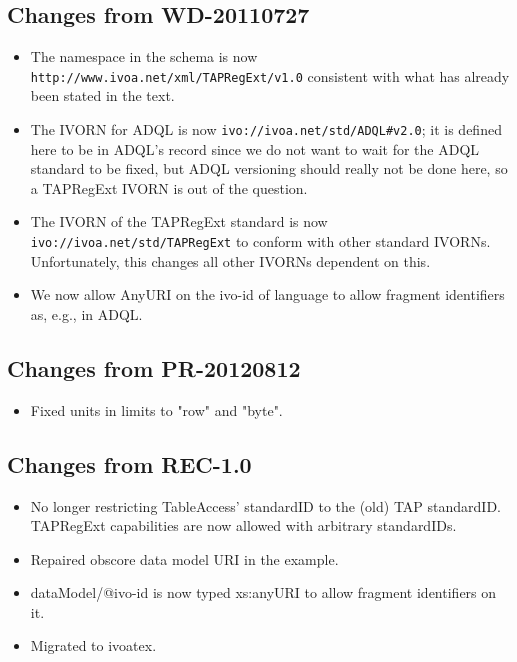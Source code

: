 \documentclass{ivoa}
\begin{document}
\subsection{Changes from WD-20110727}

\label{changes-20110727}

\begin{itemize}

\item The namespace in the schema is now \nolinkurl{http://www.ivoa.net/xml/TAPRegExt/v1.0} consistent with what has already been stated in the text.{}

\item The IVORN for ADQL is now \nolinkurl{ivo://ivoa.net/std/ADQL\#v2.0}; it is defined here to be in ADQL's record since we do not want to wait for the ADQL standard to be fixed, but ADQL versioning should really not be done here, so a TAPRegExt IVORN is out of the question.{}

\item The IVORN of the TAPRegExt standard is now \texttt{ivo://ivoa.net/std/TAPRegExt} to conform with other standard IVORNs.  Unfortunately, this changes
all other IVORNs dependent on this.{}

\item We now allow AnyURI on the ivo-id of language to allow fragment identifiers as, e.g., in ADQL.{}

\end{itemize}


\subsection{Changes from PR-20120812}

\label{changes-20120208}

\begin{itemize}

\item Fixed units in limits to "row" and "byte".{}

\end{itemize}

\subsection{Changes from REC-1.0}

\label{changes-rec-1.0}

\begin{itemize}

\item No longer restricting TableAccess' standardID to the (old)
TAP standardID.  TAPRegExt capabilities are now allowed with arbitrary
standardIDs.
\item Repaired obscore data model URI in the example.
\item dataModel/@ivo-id is now typed xs:anyURI
to allow fragment identifiers on it.{}
\item Migrated to ivoatex.


\end{itemize}


\end{document}
